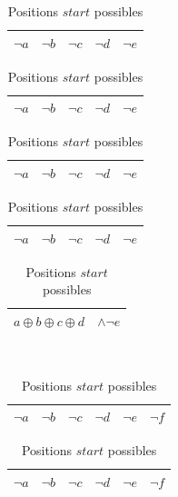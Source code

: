 \documentclass[a4paper,12pt]{report}
\newcommand\black{\cellcolor{black}}
\newcommand\grey{\cellcolor{black!50}}
\begin{document}
\begin{table}[H]
        \begin{subtable}[B]{0.5\textwidth}
        \centering
			\begin{tabular}{|c|c|c|c||c|}
			\hline 
			\color{white}$\lnot$\color{black}$a$ & $\lnot b$ & $\lnot c$  & $\lnot d$ & $\lnot e$ \\ 
			\hline
			\end{tabular}
			
			\begin{tabular}{|c|c|c|c||c|}
			\hline 
			$\lnot a$ & \color{white}$\lnot$\color{black}$b$ & $\lnot c$  & $\lnot d$ & $\lnot e$ \\ 
			\hline
			\end{tabular}
			
			\begin{tabular}{|c|c|c|c||c|}
			\hline 
			$\lnot a$ & $\lnot b$ & \color{white}$\lnot$\color{black}$c$  & $\lnot d$ & $\lnot e$ \\ 
			\hline
			\end{tabular}

			\begin{tabular}{|c|c|c|c||c|}
			\hline 
			$\lnot a$ & $\lnot b$ & $\lnot c$  & \color{white}$\lnot$\color{black}$d$ & $\lnot e$ \\ 
			\hline
			\end{tabular}

			\begin{tabular}{|c c c c c|}
			\hline 
			\multicolumn{4}{|c||}{$a \oplus b \oplus c \oplus d$} & $\wedge \lnot e$ \\ 
			\hline
			\end{tabular}			
        \caption{Positions $start$ possibles}
        \label{table:posXor}
    \end{subtable}
    ~
	    \begin{subtable}[B]{0.5\textwidth}
        \centering
			\begin{tabular}{|c|c|c|c||c|c|}
			\hline 
			\grey \color{gray}$\lnot$\color{white}$a$ & \black \color{white}$\lnot b$ &
			\black \color{white}$\lnot c$  & $\lnot d$ & $\lnot e$ & $\lnot f$\\ 
			\hline
			\end{tabular}
			
			\begin{tabular}{|c|c|c|c||c|c|}
			\hline 
			$\lnot a$ & \grey \color{gray}$\lnot$\color{white}$b$ & \black \color{white}$\lnot c$ &
			\black \color{white}$\lnot d$  & $\lnot e$ & $\lnot f$\\ 
			\hline
			\end{tabular}
			

\end{subtable}
\end{table}
\end{document}
